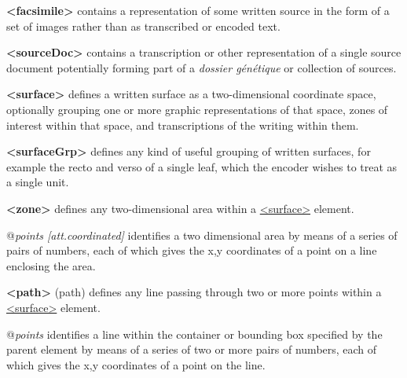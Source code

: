 \begin{sansreflist}
  
\item [\textbf{<facsimile>}] contains a representation of some written source in the form of a set of images rather than as transcribed or encoded text.
\item [\textbf{<sourceDoc>}] contains a transcription or other representation of a single source document potentially forming part of a \textit{dossier génétique} or collection of sources.
\item [\textbf{<surface>}] defines a written surface as a two-dimensional coordinate space, optionally grouping one or more graphic representations of that space, zones of interest within that space, and transcriptions of the writing within them.
\item [\textbf{<surfaceGrp>}] defines any kind of useful grouping of written surfaces, for example the recto and verso of a single leaf, which the encoder wishes to treat as a single unit.
\item [\textbf{<zone>}] defines any two-dimensional area within a \hyperref[TEI.surface]{<surface>} element.\hfil\\[-10pt]\begin{sansreflist}
    \item[@{\itshape points [att.coordinated]}]
  identifies a two dimensional area by means of a series of pairs of numbers, each of which gives the x,y coordinates of a point on a line enclosing the area.
\end{sansreflist}  
\item [\textbf{<path>}] (path) defines any line passing through two or more points within a \hyperref[TEI.surface]{<surface>} element.\hfil\\[-10pt]\begin{sansreflist}
    \item[@{\itshape points}]
  identifies a line within the container or bounding box specified by the parent element by means of a series of two or more pairs of numbers, each of which gives the x,y coordinates of a point on the line.
\end{sansreflist}  
\end{sansreflist}
\par
